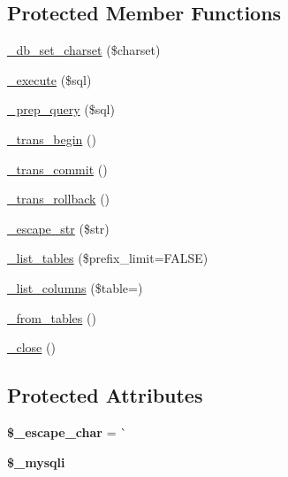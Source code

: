 \subsection*{Protected Member Functions}
\begin{DoxyCompactItemize}
\item 
\mbox{\hyperlink{class_c_i___d_b__mysqli__driver_a67ad20f0781cf5b23eee3285518b1fdf}{\+\_\+db\+\_\+set\+\_\+charset}} (\$charset)
\item 
\mbox{\hyperlink{class_c_i___d_b__mysqli__driver_a406e3425d92098146f4959d7bb578d18}{\+\_\+execute}} (\$sql)
\item 
\mbox{\hyperlink{class_c_i___d_b__mysqli__driver_ab187215fd7c35d9a3a0ac89d4132add0}{\+\_\+prep\+\_\+query}} (\$sql)
\item 
\mbox{\hyperlink{class_c_i___d_b__mysqli__driver_ac271a30b7f4a06d9633ef66d43ae54d1}{\+\_\+trans\+\_\+begin}} ()
\item 
\mbox{\hyperlink{class_c_i___d_b__mysqli__driver_aea28f355a2196e6749b0567e7abea551}{\+\_\+trans\+\_\+commit}} ()
\item 
\mbox{\hyperlink{class_c_i___d_b__mysqli__driver_a20fbf96d4bb761e282d959c78c83d799}{\+\_\+trans\+\_\+rollback}} ()
\item 
\mbox{\hyperlink{class_c_i___d_b__mysqli__driver_ae0d2f4f6b3d6e636549f02601e4f15b3}{\+\_\+escape\+\_\+str}} (\$str)
\item 
\mbox{\hyperlink{class_c_i___d_b__mysqli__driver_aa929322523ded7aa09ddaad77fd3906f}{\+\_\+list\+\_\+tables}} (\$prefix\+\_\+limit=F\+A\+L\+SE)
\item 
\mbox{\hyperlink{class_c_i___d_b__mysqli__driver_aaa362bea9155e864b77cb3fff47282fb}{\+\_\+list\+\_\+columns}} (\$table=\textquotesingle{}\textquotesingle{})
\item 
\mbox{\hyperlink{class_c_i___d_b__mysqli__driver_a1f09424e41aacd25cf17130a2346c2c7}{\+\_\+from\+\_\+tables}} ()
\item 
\mbox{\hyperlink{class_c_i___d_b__mysqli__driver_ac72b22b48f848e42821d7eb9ddd66053}{\+\_\+close}} ()
\end{DoxyCompactItemize}
\subsection*{Protected Attributes}
\begin{DoxyCompactItemize}
\item 
\mbox{\label{class_c_i___d_b__mysqli__driver_a3b5c85c584aff5d52f0ffd541d7965cd}} 
{\bfseries \$\+\_\+escape\+\_\+char} = \textquotesingle{}\`{}\textquotesingle{}
\item 
\mbox{\label{class_c_i___d_b__mysqli__driver_ad40c2ccba99eebf3f637c228e8d4a660}} 
{\bfseries \$\+\_\+mysqli}
\end{DoxyCompactItemize}


